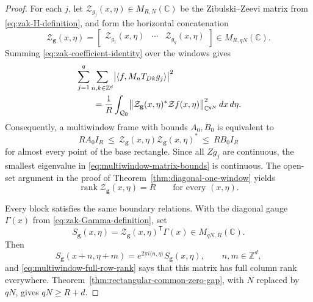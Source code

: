\documentclass[11pt,reqno]{amsart}
\numberwithin{equation}{section}
\theoremstyle{definition}
\theoremstyle{remark}
\newcommand{\Z}{\mathbb Z}
\newcommand{\C}{\mathbb C}
\newcommand{\rank}{\operatorname{rank}}
\newcommand{\ip}[2]{\langle #1,#2\rangle}
\begin{document}
\begin{proof}
For each $j$, let $\mathcal Z_{g_j}(x,\eta)\in M_{R,N}(\C)$ be the Zibulski--Zeevi matrix from
\eqref{eq:zak-H-definition}, and form the horizontal concatenation
\begin{equation}\label{eq:multiwindow-H-definition}
 \mathcal Z_{\mathbf g}(x,\eta)
   =\begin{bmatrix}
       \mathcal Z_{g_1}(x,\eta)&\cdots&\mathcal Z_{g_q}(x,\eta)
     \end{bmatrix}
   \in M_{R,qN}(\C).
\end{equation}
Summing \eqref{eq:zak-coefficient-identity} over the windows gives
\begin{align}
 &\sum_{j=1}^q\sum_{n,k\in\Z^d}
   \bigl|\ip{f}{M_nT_{Dk}g_j}\bigr|^2 \notag\\
 &\qquad=\frac1R\int_{\mathcal Q_{\mathsf B}}
       \bigl\|\mathcal Z_{\mathbf g}(x,\eta)^*\mathcal Zf(x,\eta)\bigr\|_{\C^{qN}}^2
       \,dx\,d\eta.
 \label{eq:multiwindow-coefficient-identity}
\end{align}
Consequently, a multiwindow frame with bounds $A_0,B_0$ is equivalent to
\begin{equation}\label{eq:multiwindow-matrix-bounds}
 R A_0 I_R
 \ \le\ \mathcal Z_{\mathbf g}(x,\eta)\mathcal Z_{\mathbf g}(x,\eta)^*
 \ \le\ R B_0 I_R
\end{equation}
for almost every point of the base rectangle.  Since all $Zg_j$ are continuous, the smallest eigenvalue in
\eqref{eq:multiwindow-matrix-bounds} is continuous.  The open-set argument in the proof of
Theorem~\ref{thm:diagonal-one-window} yields
\begin{equation}\label{eq:multiwindow-full-row-rank}
             \rank \mathcal Z_{\mathbf g}(x,\eta)=R
             \qquad\text{for every }(x,\eta).
\end{equation}

Every block satisfies the same boundary relations.  With the diagonal gauge
$\Gamma(x)$ from \eqref{eq:zak-Gamma-definition}, set
\begin{equation}\label{eq:multiwindow-S-definition}
 S_{\mathbf g}(x,\eta)
   =\mathcal Z_{\mathbf g}(x,\eta)^{\mathsf T}\Gamma(x)
   \in M_{qN,R}(\C).
\end{equation}
Then
\begin{equation}\label{eq:multiwindow-standard-quasi}
 S_{\mathbf g}(x+n,\eta+m)
   =e^{2\pi i\ip{n}{\eta}}S_{\mathbf g}(x,\eta),
 \qquad n,m\in\Z^d,
\end{equation}
and \eqref{eq:multiwindow-full-row-rank} says that this matrix has full
column rank everywhere.  Theorem~\ref{thm:rectangular-common-zero-gap}, with
$N$ replaced by $qN$, gives $qN\ge R+d$.
\end{proof}
\end{document}
